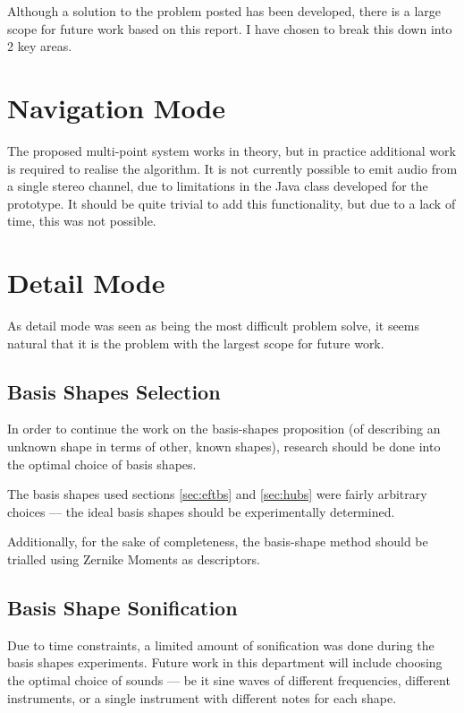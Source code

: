 Although a solution to the problem posted has been developed, there is a large scope for future work based on this report. I have chosen to break this down into 2 key areas.

\section{Navigation Mode}
The proposed multi-point system works in theory, but in practice additional work is required to realise the algorithm. It is not currently possible to emit audio from a single stereo channel, due to limitations in the Java class developed for the prototype. It should be quite trivial to add this functionality, but due to a lack of time, this was not possible.

\section{Detail Mode}
As detail mode was seen as being the most difficult problem solve, it seems natural that it is the problem with the largest scope for future work.

\subsection{Basis Shapes Selection}
In order to continue the work on the basis-shapes proposition (of describing an unknown shape in terms of other, known shapes), research should be done into the optimal choice of basis shapes.

The basis shapes used sections \ref{sec:eftbs} and \ref{sec:hubs} were fairly arbitrary choices --- the ideal basis shapes should be experimentally determined.

Additionally, for the sake of completeness, the basis-shape method should be trialled using Zernike Moments as descriptors.

\subsection{Basis Shape Sonification}
Due to time constraints, a limited amount of sonification was done during the basis shapes experiments. Future work in this department will include choosing the optimal choice of sounds --- be it sine waves of different frequencies, different instruments, or a single instrument with different notes for each shape.
